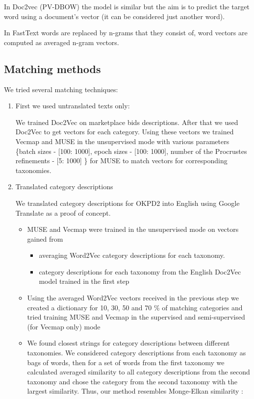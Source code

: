 \documentclass[11pt,a4paper]{article}
\begin{document}
In Doc2vec (PV-DBOW) the model is similar but the aim is to predict the target word using a document's vector (it can be considered just another word).

In FastText words are replaced by n-grams that they consist of, word vectors are computed as averaged n-gram vectors.

\subsection{Matching methods}

We tried several matching techniques:
\begin{enumerate}
	\item First we used untranslated texts only:
	
	We trained Doc2Vec on marketplace bids descriptions. After that we used Doc2Vec to get vectors for each category. Using these vectors we trained Vecmap and MUSE in the unsupervised mode with various parameters \{batch sizes - [100: 1000], epoch sizes - [100: 1000], number of the Procrustes refinements - [5: 1000] \} for MUSE to match vectors for corresponding taxonomies.
	
	\item Translated category descriptions
	
	We translated category descriptions for OKPD2 into English using Google Translate as a proof of concept.
	\begin{itemize}
		\item MUSE and Vecmap were trained in the unsupervised mode on vectors gained from \begin{itemize}
			\item averaging Word2Vec category descriptions for each taxonomy.
			\item category descriptions for each taxonomy from the English Doc2Vec model trained in the first step
		\end{itemize}
		\item Using the averaged Word2Vec vectors received in the previous step we created a dictionary for 10, 30, 50 and 70 \% of matching categories and tried training MUSE and Vecmap in the supervised and semi-supervised (for Vecmap only) mode
		\item We found closest strings for category descriptions between different taxonomies. We considered category descriptions from each taxonomy as bags of words, then for a set of words from the first taxonomy we calculated averaged similarity to all category descriptions from the second taxonomy and chose the category from the second taxonomy with the largest similarity. Thus, our method resembles Monge-Elkan similarity \cite[p.~111]{dupe-detect}:
	\end{itemize}
	

\end{enumerate}
\end{document}
